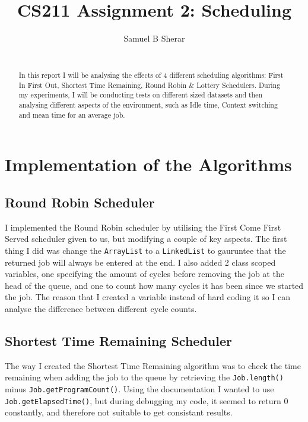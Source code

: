 \documentclass{acm_proc_article-sp}
\begin{document}
\title{CS211 Assignment 2: Scheduling}
\author{
  \alignauthor 
  Samuel B Sherar\\
  \
}
\maketitle

\begin{abstract}
In this report I will be analysing the effects of 4 different scheduling algorithms: First In First Out, Shortest Time Remaining, Round Robin \& Lottery Schedulers. During my experiments, I will be conducting tests on different sized datasets and then analysing different aspects of the environment, such as Idle time, Context switching and mean time for an average job.

\end{abstract}
\newpage

\section{Implementation of the Algorithms}
\subsection{Round Robin Scheduler}

I implemented the Round Robin scheduler by utilising the First Come First Served scheduler given to us, but modifying a couple of key aspects. The first thing I did was change the \texttt{ArrayList} to a \texttt{LinkedList} to gauruntee that the returned job will always be entered at the end. I also added 2 class scoped variables, one specifying the amount of cycles before removing the job at the head of the queue, and one to count how many cycles it has been since we started the job. The reason that I created a variable instead of hard coding it so I can analyse the difference between different cycle counts.

\subsection{Shortest Time Remaining Scheduler}

The way I created the Shortest Time Remaining algorithm was to check the time remaining when adding the job to the queue by retrieving the \texttt{Job.length()} minus \texttt{Job.get\-ProgramCount()}. Using the documentation I wanted to use \texttt{Job.getElapsedTime()}, but during debugging my code, it seemed to return 0 constantly, and therefore not suitable to get consistant results.
\end{document}
